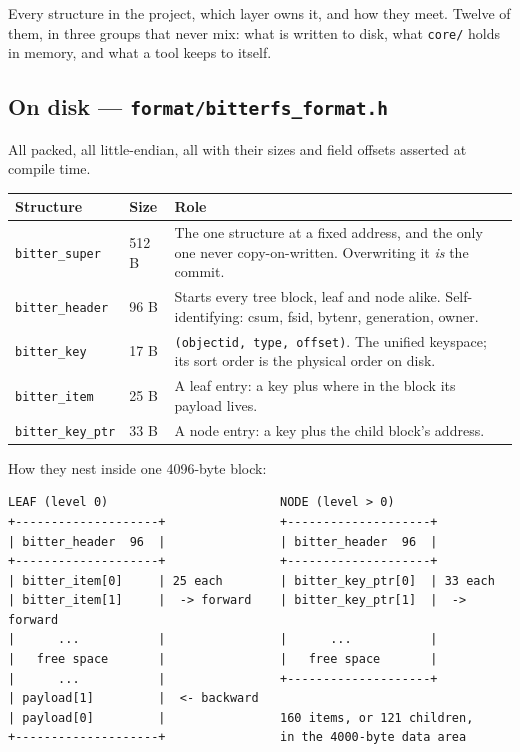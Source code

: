 Every structure in the project, which layer owns it, and how they meet. Twelve of
them, in three groups that never mix: what is written to disk, what
\texttt{core/} holds in memory, and what a tool keeps to itself.

\subsection{On disk --- \texttt{format/bitterfs\_format.h}}

All packed, all little-endian, all with their sizes and field offsets asserted
at compile time.

\begin{center}
\begin{tabular}{llp{7.2cm}}
  \toprule
  Structure & Size & Role \\
  \midrule
  \lstinline|bitter_super|   & 512 B & The one structure at a fixed address, and the only one never copy-on-written. Overwriting it \emph{is} the commit. \\
  \lstinline|bitter_header|  & 96 B  & Starts every tree block, leaf and node alike. Self-identifying: csum, fsid, bytenr, generation, owner. \\
  \lstinline|bitter_key|     & 17 B  & \texttt{(objectid, type, offset)}. The unified keyspace; its sort order is the physical order on disk. \\
  \lstinline|bitter_item|    & 25 B  & A leaf entry: a key plus where in the block its payload lives. \\
  \lstinline|bitter_key_ptr| & 33 B  & A node entry: a key plus the child block's address. \\
  \bottomrule
\end{tabular}
\end{center}

How they nest inside one 4096-byte block:

\begin{lstlisting}[style=shell]
LEAF (level 0)                        NODE (level > 0)
+--------------------+                +--------------------+
| bitter_header  96  |                | bitter_header  96  |
+--------------------+                +--------------------+
| bitter_item[0]     | 25 each        | bitter_key_ptr[0]  | 33 each
| bitter_item[1]     |  -> forward    | bitter_key_ptr[1]  |  -> forward
|      ...           |                |      ...           |
|   free space       |                |   free space       |
|      ...           |                +--------------------+
| payload[1]         |  <- backward
| payload[0]         |                160 items, or 121 children,
+--------------------+                in the 4000-byte data area
\end{lstlisting}

